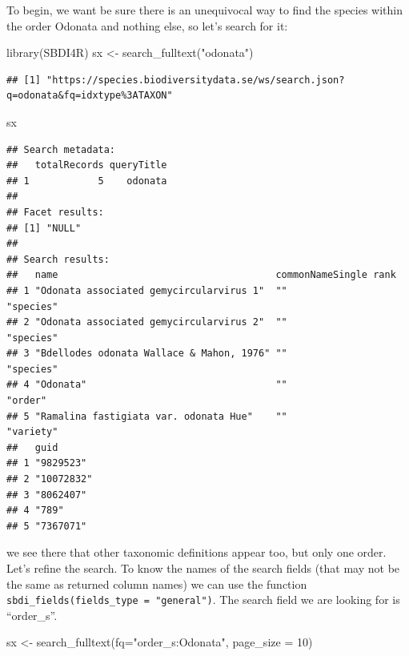\documentclass[
  10pt,
]{article}
\newenvironment{Shaded}{\begin{snugshade}}{\end{snugshade}}
\newcommand{\AttributeTok}[1]{\textcolor[rgb]{0.77,0.63,0.00}{#1}}
\newcommand{\DecValTok}[1]{\textcolor[rgb]{0.00,0.00,0.81}{#1}}
\newcommand{\FunctionTok}[1]{\textcolor[rgb]{0.00,0.00,0.00}{#1}}
\newcommand{\NormalTok}[1]{#1}
\newcommand{\OtherTok}[1]{\textcolor[rgb]{0.56,0.35,0.01}{#1}}
\newcommand{\StringTok}[1]{\textcolor[rgb]{0.31,0.60,0.02}{#1}}
\begin{document}
To begin, we want be sure there is an unequivocal way to find the species within
the order Odonata and nothing else, so let's search for it:

\begin{Shaded}
\begin{Highlighting}[]
\FunctionTok{library}\NormalTok{(SBDI4R)}
\NormalTok{sx }\OtherTok{\textless{}{-}} \FunctionTok{search\_fulltext}\NormalTok{(}\StringTok{"odonata"}\NormalTok{)}
\end{Highlighting}
\end{Shaded}

\begin{verbatim}
## [1] "https://species.biodiversitydata.se/ws/search.json?q=odonata&fq=idxtype%3ATAXON"
\end{verbatim}

\begin{Shaded}
\begin{Highlighting}[]
\NormalTok{sx}
\end{Highlighting}
\end{Shaded}

\begin{verbatim}
## Search metadata:
##   totalRecords queryTitle
## 1            5    odonata
## 
## Facet results:
## [1] "NULL"
## 
## Search results:
##   name                                      commonNameSingle rank     
## 1 "Odonata associated gemycircularvirus 1"  ""               "species"
## 2 "Odonata associated gemycircularvirus 2"  ""               "species"
## 3 "Bdellodes odonata Wallace & Mahon, 1976" ""               "species"
## 4 "Odonata"                                 ""               "order"  
## 5 "Ramalina fastigiata var. odonata Hue"    ""               "variety"
##   guid      
## 1 "9829523" 
## 2 "10072832"
## 3 "8062407" 
## 4 "789"     
## 5 "7367071"
\end{verbatim}

we see there that other taxonomic definitions appear too, but only one order.
Let's refine the search. To know the names of the search fields (that may not be
the same as returned column names) we can use the function \texttt{sbdi\_fields(fields\_type\ =\ "general")}.
The search field we are looking for is ``order\_s''.

\begin{Shaded}
\begin{Highlighting}[]
\NormalTok{sx }\OtherTok{\textless{}{-}} \FunctionTok{search\_fulltext}\NormalTok{(}\AttributeTok{fq=}\StringTok{"order\_s:Odonata"}\NormalTok{, }\AttributeTok{page\_size =} \DecValTok{10}\NormalTok{)}
\end{Highlighting}
\end{Shaded}
\end{document}
